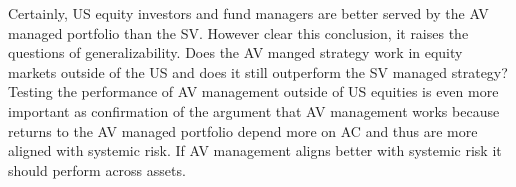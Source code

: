 Certainly, US equity investors and fund managers are better served by the AV managed portfolio than the SV. However clear this conclusion, it raises the questions of generalizability. Does the AV manged strategy work in equity markets outside of the US and does it still outperform the SV managed strategy? Testing the performance of AV management outside of US equities is even more important as confirmation of the argument that AV management works because returns to the AV managed portfolio depend more on AC and thus are more aligned with systemic risk. If AV management aligns better with systemic risk it should perform across assets.